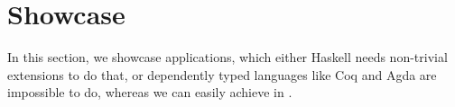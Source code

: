 \visiblecomments

\newlength{\blanklineskip}
\setlength{\blanklineskip}{0.66084ex}

\newcommand{\hsindent}[1]{\quad}%
\let\hspre\empty
\let\hspost\empty
\newcommand{\NB}{\textbf{NB}}
\newcommand{\Todo}[1]{$\langle$\textbf{To do:}~#1$\rangle$}

\EndFmtInput
\makeatother
%



\section{Showcase}
\label{sec:app}

In this section, we showcase applications, which either Haskell needs non-trivial extensions to do that, or dependently typed languages like Coq and Agda are impossible to do, whereas we can easily achieve in \name.






